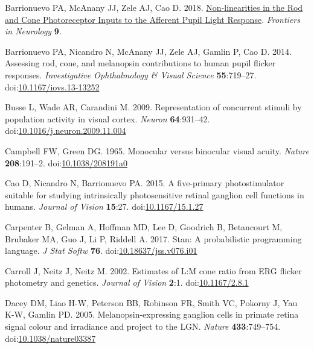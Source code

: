 \documentclass[
]{article}
\newlength{\cslhangindent}
\newlength{\cslentryspacingunit} %
\newenvironment{CSLReferences}[2] %
 {%
  \setlength{\parindent}{0pt}
  \ifodd #1
  \let\oldpar\par
  \def\par{\hangindent=\cslhangindent\oldpar}
  \fi
  \setlength{\parskip}{#2\cslentryspacingunit}
 }%
 {}
\begin{document}
\begin{CSLReferences}{1}{0}
\leavevmode{}%
Barrionuevo PA, McAnany JJ, Zele AJ, Cao D. 2018. \href{https://www.frontiersin.org/articles/10.3389/fneur.2018.01140}{Non-linearities in the {Rod} and {Cone} {Photoreceptor} {Inputs} to the {Afferent} {Pupil} {Light} {Response}}. \emph{Frontiers in Neurology} \textbf{9}.

\leavevmode{}%
Barrionuevo PA, Nicandro N, McAnany JJ, Zele AJ, Gamlin P, Cao D. 2014. Assessing rod, cone, and melanopsin contributions to human pupil flicker responses. \emph{Investigative Ophthalmology \& Visual Science} \textbf{55}:719--27. doi:\href{https://doi.org/10.1167/iovs.13-13252}{10.1167/iovs.13-13252}

\leavevmode{}%
Busse L, Wade AR, Carandini M. 2009. Representation of concurrent stimuli by population activity in visual cortex. \emph{Neuron} \textbf{64}:931--42. doi:\href{https://doi.org/10.1016/j.neuron.2009.11.004}{10.1016/j.neuron.2009.11.004}

\leavevmode{}%
Campbell FW, Green DG. 1965. Monocular versus binocular visual acuity. \emph{Nature} \textbf{208}:191--2. doi:\href{https://doi.org/10.1038/208191a0}{10.1038/208191a0}

\leavevmode{}%
Cao D, Nicandro N, Barrionuevo PA. 2015. A five-primary photostimulator suitable for studying intrinsically photosensitive retinal ganglion cell functions in humans. \emph{Journal of Vision} \textbf{15}:27. doi:\href{https://doi.org/10.1167/15.1.27}{10.1167/15.1.27}

\leavevmode{}%
Carpenter B, Gelman A, Hoffman MD, Lee D, Goodrich B, Betancourt M, Brubaker MA, Guo J, Li P, Riddell A. 2017. Stan: A probabilistic programming language. \emph{J Stat Softw} \textbf{76}. doi:\href{https://doi.org/10.18637/jss.v076.i01}{10.18637/jss.v076.i01}

\leavevmode{}%
Carroll J, Neitz J, Neitz M. 2002. Estimates of {L}:{M} cone ratio from {ERG} flicker photometry and genetics. \emph{Journal of Vision} \textbf{2}:1. doi:\href{https://doi.org/10.1167/2.8.1}{10.1167/2.8.1}

\leavevmode{}%
Dacey DM, Liao H-W, Peterson BB, Robinson FR, Smith VC, Pokorny J, Yau K-W, Gamlin PD. 2005. Melanopsin-expressing ganglion cells in primate retina signal colour and irradiance and project to the {LGN}. \emph{Nature} \textbf{433}:749--754. doi:\href{https://doi.org/10.1038/nature03387}{10.1038/nature03387}


\end{CSLReferences}
\end{document}
